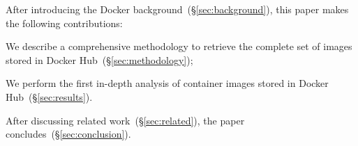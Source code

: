 After introducing the Docker background~(\S\ref{sec:background}),
this paper makes the following contributions:
\begin{compactenumerate}
  \item We describe a comprehensive methodology to retrieve the complete set of
  	images stored in Docker Hub~(\S\ref{sec:methodology});
  \item We perform the first in-depth analysis of container images stored in
    Docker Hub~(\S\ref{sec:results}).
\end{compactenumerate}

After discussing related work~(\S\ref{sec:related}),
the paper concludes~(\S\ref{sec:conclusion}).

